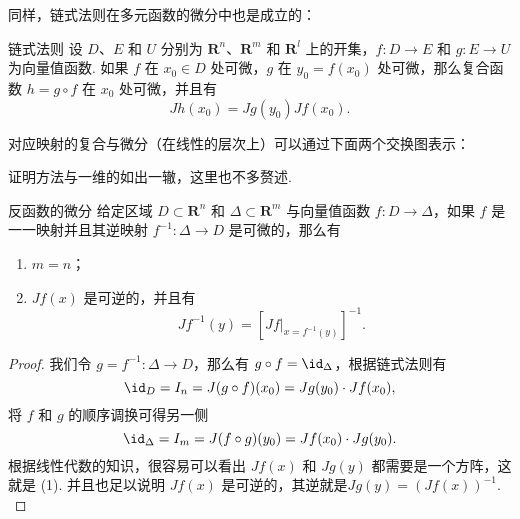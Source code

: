 同样，链式法则在多元函数的微分中也是成立的：

\begin{theorem}{链式法则}{}
    设 $D$、$E$ 和 $U$ 分别为 $\mathbf{R}^n$、$\mathbf{R}^m$ 和 $\mathbf{R}^l$ 上的开集，$f\colon D\to E$ 和 $g\colon E\to U$ 为向量值函数. 如果 $f$ 在 $x_0\in D$ 处可微，$g$ 在 $y_0 = f(x_0)$ 处可微，那么复合函数 $h = g\circ f$ 在 $x_0$ 处可微，并且有\[Jh(x_0) = Jg(y_0)Jf(x_0).\]

    对应映射的复合与微分（在线性的层次上）可以通过下面两个交换图表示：
    \begin{center}
        \qquad
    \end{center}
\end{theorem}

证明方法与一维的如出一辙，这里也不多赘述.

\begin{corollary}{反函数的微分}{}
    给定区域 $D\subset \mathbf{R}^n$ 和 $\Delta \subset \mathbf{R}^m$ 与向量值函数 $f\colon D\to \Delta$，如果 $f$ 是一一映射并且其逆映射 $f^{-1}\colon \Delta\to D$ 是可微的，那么有
    \begin{enumerate}[label=(\arabic*)]
        \item $m = n$；
        \item $Jf(x)$ 是可逆的，并且有 \[Jf^{-1}(y) = [\left.Jf\right|_{x = f^{-1}(y)}]^{-1}.\]
    \end{enumerate}
\end{corollary}

\begin{proof}
    我们令 $g = f^{-1}\colon \Delta\to D$，那么有 $g \circ f = \id_{\Delta}$，根据链式法则有 \[\id_{D} = I_{n} = J(g\circ f)(x_0) = Jg(y_0)\cdot Jf(x_0),\]
    将 $f$ 和 $g$ 的顺序调换可得另一侧 \[\id_{\Delta} = I_m = J(f\circ g)(y_0) = Jf(x_0)\cdot Jg(y_0).\]
    根据线性代数的知识，很容易可以看出 $Jf(x)$ 和 $Jg(y)$ 都需要是一个方阵，这就是 (1). 并且也足以说明 $Jf(x)$ 是可逆的，其逆就是$Jg(y) = (Jf(x))^{-1}.$
\end{proof}

